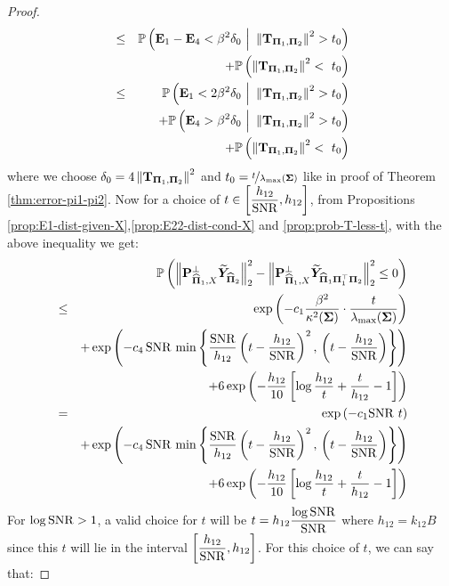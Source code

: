 \documentclass[numsec,webpdf,modern,medium,namedate]{oup-authoring-template}
\theoremstyle{thmstyleone}%
\theoremstyle{thmstyletwo}%
\theoremstyle{thmstylethree}%
\begin{document}
\begin{proof}
{\begin{eqnarray*}
        & \leq & \Prob\left(\bE_1 - \bE_4 < \beta^2\delta_0 \ {\Big|} \ \left\|\bT_{\bPi_1, \bPi_2} \right\|^2 > t_0\right) \\
        && + \Prob\left(\left\|\bT_{\bPi_1, \bPi_2} \right\|^2 <
        \ t_0\right)\\
        & \leq & \Prob\left(\bE_1 < 2\beta^2\delta_0\ {\Big|} \ \left\|\bT_{\bPi_1, \bPi_2} \right\|^2 > t_0\right)\\
        && + \Prob\left(\bE_4 > \beta^2\delta_0 \ {\Big|} \ \left\|\bT_{\bPi_1, \bPi_2} \right\|^2 > t_0\right)\\     
         && + \Prob\left(\left\|\bT_{\bPi_1, \bPi_2} \right\|^2 <
        \ t_0\right)\\
\end{eqnarray*}}
where we choose $\delta_0 = 4\left\|\mathbf{T}_{\boldsymbol{\Pi}_1, \boldsymbol{\Pi}_2} \right\|^2$ and $t_0 = \nicefrac{t}{\lambda_{\max}(\boldsymbol{\Sigma})}$ like in proof of Theorem \ref{thm:error-pi1-pi2}. Now for a choice of $t \in \left[\dfrac{h_{12}}{\mathrm{SNR}},h_{12}\right]$, from Propositions \ref{prop:E1-dist-given-X},\ref{prop:E22-dist-cond-X} and \ref{prop:prob-T-less-t}, with the above inequality we get:
{\footnotesize
\begin{eqnarray*}
    &&\mathbb{P}\left(\left\| \mathbf{P}_{\widehat{\boldsymbol{\Pi}}_1, X}^\perp \widetilde{\boldsymbol{Y}}_{{\widehat{\boldsymbol{\Pi}}_2}}\right\|_2^2 
- \left\| \mathbf{P}_{\widehat{\boldsymbol{\Pi}}_1, X}^\perp \widetilde{\boldsymbol{Y}}_{\widehat{\boldsymbol{\Pi}}_1 \boldsymbol{\Pi}_1^\top \boldsymbol{\Pi}_2} \right\|_2^2 \leq 0\right) \\
& \leq & \exp\left(-c_1\dfrac{\beta^2}{\kappa^{2}(\boldsymbol{\Sigma})}\cdot \dfrac{t}{\lambda_{\max}(\boldsymbol{\Sigma})}\right)  \\
&& + \exp \left( - c_{4} \, \mathrm{SNR} \, \min \left\{\frac{\mathrm{SNR}}{h_{12}}\left(t - \dfrac{h_{12}}{\mathrm{SNR}}\right)^2, \, \left(t - \dfrac{h_{12}}{\mathrm{SNR}}\right) \right\}\right)\\
&& + 6 \exp\left(-\frac{h_{12}}{10}\left[\log \frac{h_{12}}{t} + \dfrac{t}{h_{12}} -1\right]\right)\\
        & = & \exp\left(-c_1\mathrm{SNR} \ t\right)\\
        && +  \exp \left( - c_{4} \, \mathrm{SNR} \, \min \left\{\frac{\mathrm{SNR}}{h_{12}}\left(t - \dfrac{h_{12}}{\mathrm{SNR}}\right)^2, \, \left(t - \dfrac{h_{12}}{\mathrm{SNR}}\right) \right\}\right)\\
        && + 6 \exp\left(-\frac{h_{12}}{10}\left[\log \frac{h_{12}}{t} + \dfrac{t}{h_{12}} -1\right]\right)\\
\end{eqnarray*}}
For {$\log \mathrm{SNR} > 1$}, a valid choice for $t$ will be $t = h_{12}\dfrac{\log \mathrm{SNR}}{\mathrm{SNR}}$ where $h_{12} = k_{12}B$ since this $t$ will lie in the interval $\left[\dfrac{h_{12}}{\mathrm{SNR}},h_{12}\right]$. For this choice of $t$, we can say that:

\end{proof}
\end{document}
